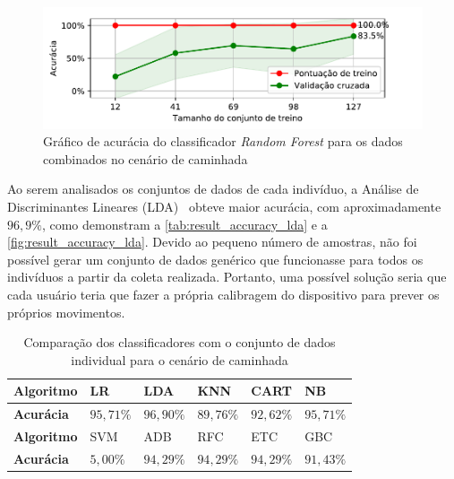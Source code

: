 \begin{figure}[ht]
	\caption{\label{fig:result_accuracy_rfc}Gráfico de acurácia do classificador \textit{Random Forest} para os dados combinados no cenário de caminhada}
	\begin{center}
		\includegraphics[width=\textwidth]{resources/result_accuracy_rfc}
	\end{center}
\end{figure}

\newpage

Ao serem analisados os conjuntos de dados de cada indivíduo, a Análise de Discriminantes Lineares (LDA)~\cite{scikit:lda} obteve maior acurácia, com aproximadamente \(96{,}9\%\), como demonstram a \autoref{tab:result_accuracy_lda} e a \autoref{fig:result_accuracy_lda}. Devido ao pequeno número de amostras, não foi possível gerar um conjunto de dados genérico que funcionasse para todos os indivíduos a partir da coleta realizada. Portanto, uma possível solução seria que cada usuário teria que fazer a própria calibragem do dispositivo para prever os próprios movimentos.

\begin{table}[ht]
	\caption{Comparação dos classificadores com o conjunto de dados individual para o cenário de caminhada}%
	\label{tab:result_accuracy_lda}
	\begin{tabularx}{\textwidth}{X X X X X X}
		\toprule
		\textbf{Algoritmo} & LR            & LDA           & KNN           & CART          & NB            \\ \midrule
		\textbf{Acurácia}  & \(95{,}71\%\) & \(96{,}90\%\) & \(89{,}76\%\) & \(92{,}62\%\) & \(95{,}71\%\) \\ \bottomrule \toprule
		\textbf{Algoritmo} & SVM           & ADB           & RFC           & ETC           & GBC           \\ \midrule
		\textbf{Acurácia}  & \(5{,}00\%\)  & \(94{,}29\%\) & \(94{,}29\%\) & \(94{,}29\%\) & \(91{,}43\%\) \\ \bottomrule
	\end{tabularx}
\end{table}

